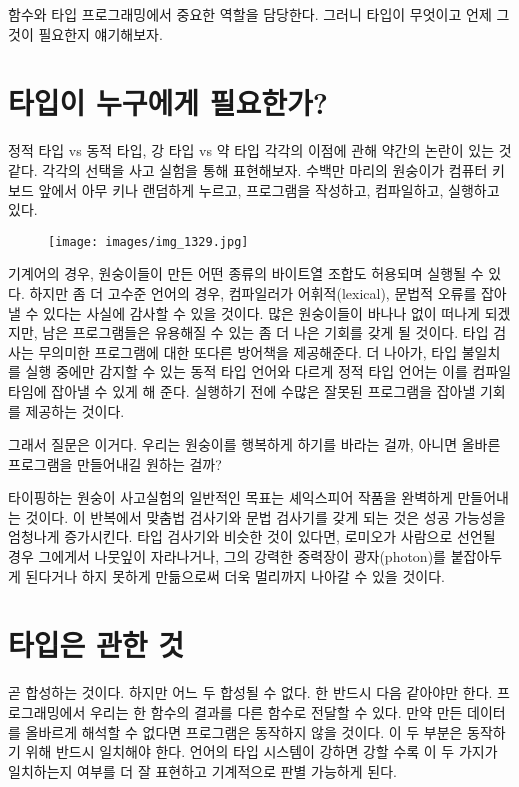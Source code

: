 
\lettrine[lhang=0.17]{함}{수}와 타입 \trCategory\는  프로그래밍에서 중요한 역할을 담당한다. 그러니 타입이 무엇이고 언제 그것이 필요한지 얘기해보자.

\section{타입이 누구에게 필요한가?}

정적 타입 vs 동적 타입, 강 타입 vs 약 타입 각각의 이점에 관해 약간의 논란이 있는 것 같다.
각각의 선택을 사고 실험을 통해 표현해보자. 수백만 마리의 원숭이가 컴퓨터 키보드 앞에서 아무 키나 랜덤하게 누르고, 프로그램을 작성하고, 컴파일하고, 실행하고 있다.

\begin{figure}[H]
\centering
\texttt{[image: images/img\_1329.jpg]}
\end{figure}

\noindent
기계어의 경우, 원숭이들이 만든 어떤 종류의 바이트열 조합도 허용되며 실행될 수 있다.
하지만 좀 더 고수준 언어의 경우, 컴파일러가 어휘적(lexical), 문법적 오류를 잡아낼 수 있다는 사실에 감사할 수 있을 것이다.
많은 원숭이들이 바나나 없이 떠나게 되겠지만, 남은 프로그램들은 유용해질 수 있는 좀 더 나은 기회를 갖게 될 것이다.
타입 검사는 무의미한 프로그램에 대한 또다른 방어책을 제공해준다.
더 나아가, 타입 불일치를 실행 중에만 감지할 수 있는 동적 타입 언어와 다르게 정적 타입 언어는 이를 컴파일 타임에 잡아낼 수 있게 해 준다.
실행하기 전에 수많은 잘못된 프로그램을 잡아낼 기회를 제공하는 것이다.

그래서 질문은 이거다. 우리는 원숭이를 행복하게 하기를 바라는 걸까, 아니면 올바른 프로그램을 만들어내길 원하는 걸까?

타이핑하는 원숭이 사고실험의 일반적인 목표는 셰익스피어 작품을 완벽하게 만들어내는 것이다.
이 반복에서 맞춤법 검사기와 문법 검사기를 갖게 되는 것은 성공 가능성을 엄청나게 증가시킨다.
타입 검사기와 비슷한 것이 있다면, 로미오가 사람으로 선언될 경우 그에게서 나뭇잎이 자라나거나, 그의 강력한 중력장이 광자(photon)를 붙잡아두게 된다거나 하지 못하게 만듦으로써 더욱 멀리까지 나아갈 수 있을 것이다.

\section{타입은  관한 것}

 곧 \trArrow\를 합성하는 것이다. 하지만 어느 두  합성될 수 없다. 
한  \trTargetObject\는 반드시 다음  \trSourceObject\와 같아야만 한다.
프로그래밍에서 우리는 한 함수의 결과를 다른 함수로 전달할 수 있다.
만약 \trTargetFunction\이  만든 데이터를 올바르게 해석할 수 없다면 프로그램은 동작하지 않을 것이다.
이 두 부분은 \trComposition\이 동작하기 위해 반드시 일치해야 한다.
언어의 타입 시스템이 강하면 강할 수록 이 두 가지가 일치하는지 여부를 더 잘 표현하고 기계적으로 판별 가능하게 된다.

